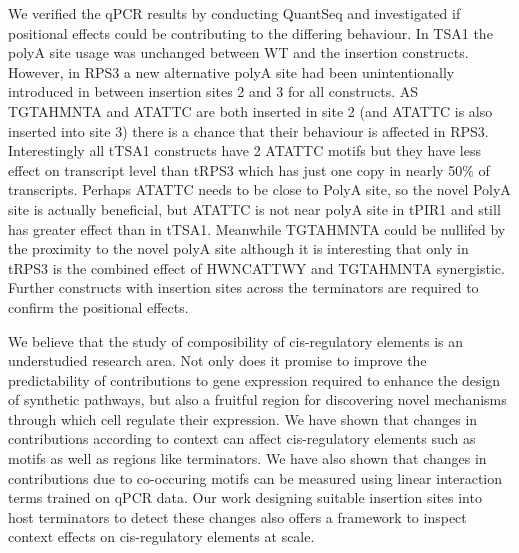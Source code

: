 \documentclass{SBCbookchapter}
\begin{document}
We verified the qPCR results by conducting QuantSeq and investigated if positional effects could be contributing to the differing behaviour. In TSA1 the polyA site usage was unchanged between WT and the insertion constructs. However, in RPS3 a new alternative polyA site had been unintentionally introduced in between insertion sites 2 and 3 for all constructs. AS TGTAHMNTA and ATATTC are both inserted in site 2 (and ATATTC is also inserted into site 3) there is a chance that their behaviour is affected in RPS3.
Interestingly all tTSA1 constructs have 2 ATATTC motifs but they have less effect on transcript level than tRPS3 which has just one copy in nearly 50\% of transcripts. Perhaps ATATTC needs to be close to PolyA site, so the novel PolyA site is actually beneficial, but ATATTC is not near polyA site in tPIR1 and still has greater effect than in tTSA1. Meanwhile TGTAHMNTA could be nullifed by the proximity to the novel polyA site although it is interesting that only in tRPS3 is the combined effect of HWNCATTWY and TGTAHMNTA synergistic. Further constructs with insertion sites across the terminators are required to confirm the positional effects.

We believe that the study of composibility of cis-regulatory elements is an understudied research area. Not only does it promise to improve the predictability of contributions to gene expression required to enhance the design of synthetic pathways, but also a fruitful region for discovering novel mechanisms through which cell regulate their expression. We have shown that changes in contributions according to context can affect cis-regulatory elements such as motifs as well as regions like terminators. We have also shown that changes in contributions due to co-occuring motifs can be measured using linear interaction terms trained on qPCR data. Our work designing suitable insertion sites into host terminators to detect these changes also offers a framework to inspect context effects on cis-regulatory elements at scale. 

%
%
\end{document}
